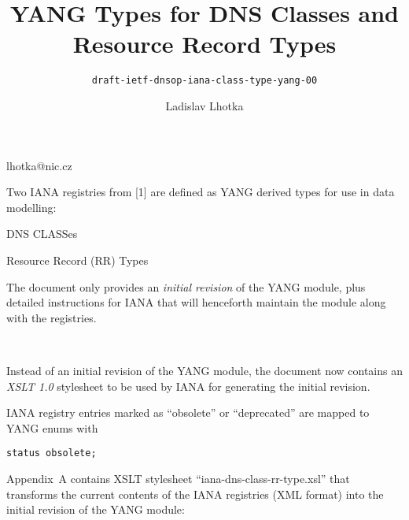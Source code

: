 

\def\prop{{\bf Proposal: }}
\def\opts{{\bf Options:}\numberList}
\let\endOpts=\endNumberList
\def\dstore#1{$\langle\hbox{#1}\rangle$}

\title{YANG Types for DNS Classes and Resource Record Types}
\subtitle{\normalSize\tt draft-ietf-dnsop-iana-class-type-yang-00}

\author{Ladislav Lhotka}{lhotka@nic.cz}

\date [2020-04-23]

\slide[Summary]

Two IANA registries from [1] are defined as YANG derived types for use
in data modelling:

\bulletList
\item DNS CLASSes
\item Resource Record (RR) Types
\endBulletList

The document only provides an {\it initial revision\/} of the YANG
module, plus detailed instructions for IANA that will henceforth
maintain the module along with the registries.

{\petit
[1]~}


\bulletList

\item Instead of an initial revision of the YANG module, the
document now contains an {\it XSLT 1.0\/} stylesheet to be used by
IANA for generating the initial revision.

\item IANA registry entries marked as “obsolete” or “deprecated” are
mapped to YANG enums with

{\tt status obsolete;}

\endBulletList


Appendix A contains XSLT stylesheet “iana-dns-class-rr-type.xsl” that
transforms the current contents of the IANA registries (XML format)
into the initial revision of the YANG module:

\medskip

